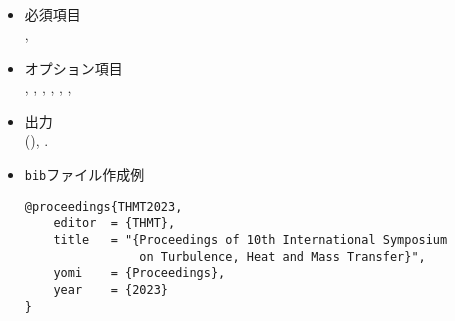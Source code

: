 \documentclass[a4paper,fleqn,uplatex,dvipdfmx]{jsarticle}
\begin{document}
\subsection{\ttproceedings}
\label{ssec:proceedings}
\begin{screen}
    \begin{itemize}
        \item 必須項目 \\
        \tttitle, \ttyear
        \item オプション項目 \\
        \tteditor, \ttorganization, \ttpublisher, \ttaddress, \ttmonth, \ttnote, \ttkey
        \item 出力 \\
            \colorbox[gray]{0.8}{\tttitle} (\colorbox[gray]{0.8}{\ttyear}), \colorbox[gray]{0.8}{\ttnote}.
        \item \verb|bib|ファイル作成例 \vspace{-3mm}
\begin{verbatim}
@proceedings{THMT2023,
    editor  = {THMT},
    title   = "{Proceedings of 10th International Symposium 
                on Turbulence, Heat and Mass Transfer}",
    yomi    = {Proceedings},
    year    = {2023}
}
\end{verbatim}
    \end{itemize}
\end{screen}
\end{document}
